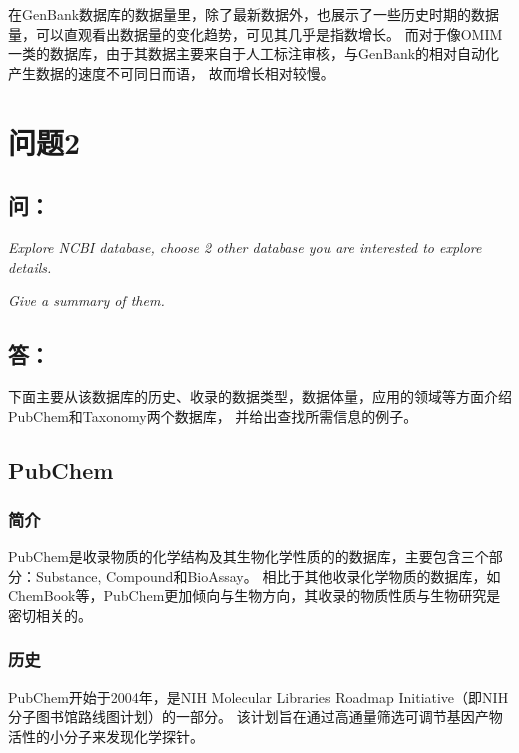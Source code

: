\documentclass[cn,black,12pt,normal]{elegantnote}
\newcommand{\upcite}[1]{\textsuperscript{\textsuperscript{\cite{#1}}}}
\begin{document}
在GenBank数据库的数据量里，除了最新数据外，也展示了一些历史时期的数据量，可以直观看出数据量的变化趋势，可见其几乎是指数增长。
而对于像OMIM一类的数据库，由于其数据主要来自于人工标注审核，与GenBank的相对自动化产生数据的速度不可同日而语，
故而增长相对较慢。




\section{问题2}
\subsection*{问：}

\textit{Explore NCBI database, choose 2 other database you are interested to explore details.}

\textit{Give a summary of them.}

\subsection*{答：}

下面主要从该数据库的历史、收录的数据类型，数据体量，应用的领域等方面介绍PubChem和Taxonomy两个数据库，
并给出查找所需信息的例子。

\subsection{PubChem\upcite{kim2016pubchem}}

\subsubsection{简介}
PubChem是收录物质的化学结构及其生物化学性质的的数据库，主要包含三个部分：Substance, Compound和BioAssay。
相比于其他收录化学物质的数据库，如ChemBook等，PubChem更加倾向与生物方向，其收录的物质性质与生物研究是密切相关的。
\subsubsection{历史}
PubChem开始于2004年，是NIH Molecular Libraries Roadmap Initiative（即NIH分子图书馆路线图计划）的一部分。
该计划旨在通过高通量筛选可调节基因产物活性的小分子来发现化学探针。
\end{document}

